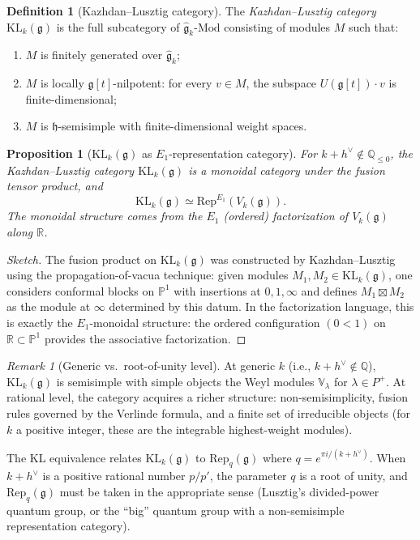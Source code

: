 \documentclass[11pt]{article}
\newtheorem{proposition}[theorem]{Proposition}
\theoremstyle{definition}
\newtheorem{definition}[theorem]{Definition}
\theoremstyle{remark}
\newtheorem{remark}[theorem]{Remark}
\newcommand{\Mod}{\mathrm{Mod}}
\newcommand{\Rep}{\mathrm{Rep}}
\newcommand{\frakg}{\mathfrak{g}}
\newcommand{\frakh}{\mathfrak{h}}
\newcommand{\KL}{\mathrm{KL}}
\newcommand{\hv}{h^\vee}
\begin{document}
\begin{definition}[Kazhdan--Lusztig category]
\label{def:kl-category}
The \emph{Kazhdan--Lusztig category} $\KL_k(\frakg)$ is the full subcategory
of $\hat{\frakg}_k\text{-}\Mod$ consisting of modules $M$ such that:
\begin{enumerate}[label=(\roman*)]
 \item $M$ is finitely generated over $\hat{\frakg}_k$;
 \item $M$ is locally $\frakg[t]$-nilpotent: for every $v \in M$, the
 subspace $U(\frakg[t]) \cdot v$ is finite-dimensional;
 \item $M$ is $\frakh$-semisimple with finite-dimensional weight spaces.
\end{enumerate}
\end{definition}

\begin{proposition}[$\KL_k(\frakg)$ as $E_1$-representation category]
\label{prop:kl-e1-rep}
For $k + \hv \notin \mathbb{Q}_{\le 0}$, the Kazhdan--Lusztig category
$\KL_k(\frakg)$ is a monoidal category under the fusion tensor product,
and
\[
 \KL_k(\frakg) \simeq \Rep^{E_1}(V_k(\frakg)).
\]
The monoidal structure comes from the $E_1$ (ordered) factorization of
$V_k(\frakg)$ along $\mathbb{R}$.
\end{proposition}

\begin{proof}[Sketch]
The fusion product on $\KL_k(\frakg)$ was constructed by Kazhdan--Lusztig
\cite{KL1} using the propagation-of-vacua technique: given modules
$M_1, M_2 \in \KL_k(\frakg)$, one considers conformal blocks on
$\mathbb{P}^1$ with insertions at $0, 1, \infty$ and defines
$M_1 \boxtimes M_2$ as the module at $\infty$ determined by this
datum. In the factorization language, this is exactly the $E_1$-monoidal
structure: the ordered configuration $(0 < 1)$ on $\mathbb{R} \subset \mathbb{P}^1$
provides the associative factorization.
\end{proof}

\begin{remark}[Generic vs.\ root-of-unity level]
\label{rem:generic-vs-rou}
At generic $k$ (i.e., $k + \hv \notin \mathbb{Q}$), $\KL_k(\frakg)$ is
semisimple with simple objects the Weyl modules $\mathbb{V}_\lambda$ for
$\lambda \in P^+$. At rational level, the category acquires a richer
structure: non-semisimplicity, fusion rules governed by the Verlinde
formula, and a finite set of irreducible objects (for $k$ a positive
integer, these are the integrable highest-weight modules).

The KL equivalence relates $\KL_k(\frakg)$ to $\Rep_q(\frakg)$ where
$q = e^{\pi i/(k+\hv)}$. When $k + \hv$ is a positive rational number
$p/p'$, the parameter $q$ is a root of unity, and $\Rep_q(\frakg)$ must
be taken in the appropriate sense (Lusztig's divided-power quantum group,
or the ``big'' quantum group with a non-semisimple representation
category).
\end{remark}
\end{document}

